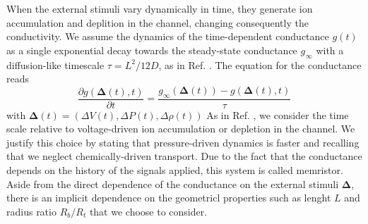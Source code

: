 \documentclass[reprint,superscriptaddress,prb,showkeys]{revtex4-2}
\newcommand{\brac}[1]{\left(#1 \right)} %
\begin{document}

When the external stimuli vary dynamically in time, they generate ion accumulation and deplition in the channel, changing consequently the conductivity. We assume the dynamics of the time-dependent conductance $g(t)$ as a single exponential decay towards the steady-state conductance $g_{\infty}$ with a diffusion-like timescale $\tau = L^2/12D$, as in Ref. \cite{Rene_IonicNeuromorphic}. The equation for the conductance reads
\begin{equation}
\frac{\partial g\brac{\boldsymbol{\Delta}(t), t}}{\partial t} = \frac{g_{\infty}\brac{\boldsymbol{\Delta}(t)}-g\brac{\boldsymbol{\Delta}(t), t}}{\tau}
\label{eq:eqofmotconductance}
\end{equation}
with $\boldsymbol{\Delta}(t) = \brac{\Delta V\brac{t},\Delta P\brac{t}, \Delta \rho\brac{t}}$
As in Ref. \cite{Rene_IonicNeuromorphic}, we consider the time scale relative to voltage-driven ion accumulation or depletion in the channel. We justify this choice by stating that pressure-driven dynamics is faster and recalling that we neglect chemically-driven transport. Due to the fact that the conductance depends on the history of the signals applied, this system is called memristor. Aside from the direct dependence of the conductance on the external stimuli $\boldsymbol{\Delta}$, there is an implicit dependence on the geometricl properties such as lenght $L$ and radius ratio $R_b/R_t$ that we choose to consider.
\end{document}
